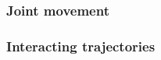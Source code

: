 \documentclass[letterpaper]{article}
\begin{document}
\subsubsection{Joint movement}

\subsubsection{Interacting trajectories}
 



\end{document}
